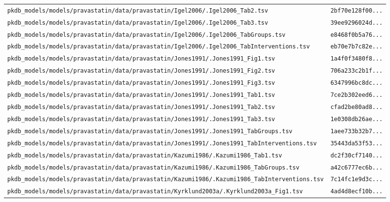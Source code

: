 \begin{longtable}{ll}
\texttt{pkdb\_models/models/pravastatin/data/pravastatin/Igel2006/.Igel2006\_Tab2.tsv} & \texttt{2bf70e128f00...} \\
\texttt{pkdb\_models/models/pravastatin/data/pravastatin/Igel2006/.Igel2006\_Tab3.tsv} & \texttt{39ee9296024d...} \\
\texttt{pkdb\_models/models/pravastatin/data/pravastatin/Igel2006/.Igel2006\_TabGroups.tsv} & \texttt{e8468f0b5a76...} \\
\texttt{pkdb\_models/models/pravastatin/data/pravastatin/Igel2006/.Igel2006\_TabInterventions.tsv} & \texttt{eb70e7b7c82e...} \\
\texttt{pkdb\_models/models/pravastatin/data/pravastatin/Jones1991/.Jones1991\_Fig1.tsv} & \texttt{1a4f0f3480f8...} \\
\texttt{pkdb\_models/models/pravastatin/data/pravastatin/Jones1991/.Jones1991\_Fig2.tsv} & \texttt{706a233c2b1f...} \\
\texttt{pkdb\_models/models/pravastatin/data/pravastatin/Jones1991/.Jones1991\_Fig3.tsv} & \texttt{6347996bc8dc...} \\
\texttt{pkdb\_models/models/pravastatin/data/pravastatin/Jones1991/.Jones1991\_Tab1.tsv} & \texttt{7ce2b302eed6...} \\
\texttt{pkdb\_models/models/pravastatin/data/pravastatin/Jones1991/.Jones1991\_Tab2.tsv} & \texttt{cfad2be80ad8...} \\
\texttt{pkdb\_models/models/pravastatin/data/pravastatin/Jones1991/.Jones1991\_Tab3.tsv} & \texttt{1e0308db26ae...} \\
\texttt{pkdb\_models/models/pravastatin/data/pravastatin/Jones1991/.Jones1991\_TabGroups.tsv} & \texttt{1aee733b32b7...} \\
\texttt{pkdb\_models/models/pravastatin/data/pravastatin/Jones1991/.Jones1991\_TabInterventions.tsv} & \texttt{35443da53f53...} \\
\texttt{pkdb\_models/models/pravastatin/data/pravastatin/Kazumi1986/.Kazumi1986\_Tab1.tsv} & \texttt{dc2f30cf7140...} \\
\texttt{pkdb\_models/models/pravastatin/data/pravastatin/Kazumi1986/.Kazumi1986\_TabGroups.tsv} & \texttt{a42c6777ec6b...} \\
\texttt{pkdb\_models/models/pravastatin/data/pravastatin/Kazumi1986/.Kazumi1986\_TabInterventions.tsv} & \texttt{7c14fc1e9d3c...} \\
\texttt{pkdb\_models/models/pravastatin/data/pravastatin/Kyrklund2003a/.Kyrklund2003a\_Fig1.tsv} & \texttt{4ad4d8ecf10b...} \\

\end{longtable}
